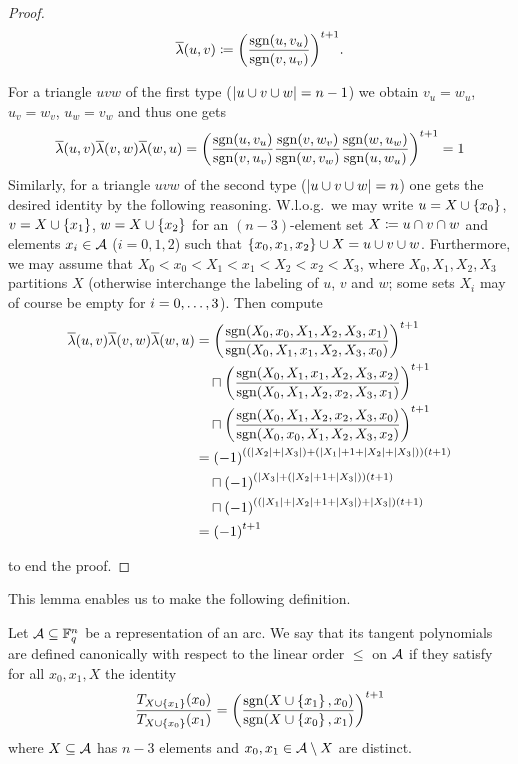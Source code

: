 \begin{proof}
    $$
    \overline{\lambda}(u,v)\mathrel{\mathrel{\mathop:}\mkern-1.2mu=} {\left(\frac{\mathop\mathrm{sgn}(u,v_u)}{\mathop\mathrm{sgn}(v,u_v)}\right)}^{t+1}\text{.}
    $$
    
    For a triangle $uvw$ of the first type ($\left\vert{u\cup v\cup w}\right\vert=n-1$) we obtain $v_u=w_u$, $u_v=w_v$, $u_w=v_w$ and thus one gets
    $$
    \overline{\lambda}(u,v)\overline{\lambda}(v,w)\overline{\lambda}(w,u) ={\left(\frac{\mathop\mathrm{sgn}(u,v_u)}{\mathop\mathrm{sgn}(v,u_v)}\frac{\mathop\mathrm{sgn}(v,w_v)}{\mathop\mathrm{sgn}(w,v_w)}\frac{\mathop\mathrm{sgn}(w,u_w)}{\mathop\mathrm{sgn}(u,w_u)}\right)}^{t+1}\\
    =1
    $$
    Similarly, for a triangle $uvw$ of the second type ($\left\vert{u\cup v\cup w}\right\vert=n$) one gets the desired identity by the following reasoning. W.l.o.g.\ we may write $u=X\setjoin\set{x_0}$, $v=X\setjoin\set{x_1}$, $w=X\setjoin\set{x_2}$ for an $(n-3)$-element set $X\mathrel{\mathrel{\mathop:}\mkern-1.2mu=} u\cap v\cap w$ and elements $x_i\in \mathcal{A}$ ($i=0,1,2$) such that $\set{x_0,x_1,x_2}\setjoin X=u\setjoin v\setjoin w$. Furthermore, we may assume that $X_0<x_0<X_1<x_1<X_2<x_2<X_3$, where $X_0,X_1,X_2,X_3$ partitions $X$ (otherwise interchange the labeling of $u$, $v$ and $w$; some sets $X_i$ may of course be empty for $i=\range 0 3$). Then compute
    \begin{align*}
        \bar{\lambda}(u,v)\bar{\lambda}(v,w)\bar{\lambda}(w,u) 
 & = {\left(\frac{\sgn(X_0,x_0,X_1,X_2,X_3,x_1)}{\sgn(X_0,X_1,x_1,X_2,X_3,x_0)}\right)}^{t+1}              \\
 & \quad\setprod {\left(\frac{\sgn(X_0,X_1,x_1,X_2,X_3,x_2)}{\sgn(X_0,X_1,X_2,x_2,X_3,x_1)}\right)}^{t+1} \\
 & \quad\setprod {\left(\frac{\sgn(X_0,X_1,X_2,x_2,X_3,x_0)}{\sgn(X_0,x_0,X_1,X_2,X_3,x_2)}\right)}^{t+1} \\
 & = {(-1)}^{((|X_2|+|X_3|)+(|X_1|+1+|X_2|+|X_3|))(t+1)}                                                 \\
 & \quad\setprod {(-1)}^{(|X_3|+(|X_2|+1+|X_3|))(t+1)}                                                   \\
 & \quad\setprod {(-1)}^{((|X_1|+|X_2|+1+|X_3|)+|X_3|)(t+1)}                                            \\
 & = {(-1)}^{t+1}
\end{align*}

  to end the proof.
\end{proof}

This lemma enables us to make the following definition.

\begin{definition}
    Let $\mathcal{A}\subseteq\mathbb{F}_{q}^n$ be a representation of an arc. We say that its tangent polynomials are defined canonically with respect to the linear order $\leq$ on $\mathcal{A}$ if they satisfy for all $x_0,x_1,X$ the identity
    $$
    \frac{T_{X\setjoin\set{x_1}}(x_0)}{T_{X\setjoin\set{x_0}}(x_1)} = {\left(\frac{\sgn(X\setjoin\set{x_1},x_0)}{\sgn(X\setjoin\set{x_0},x_1)}\right)}^{t+1}
    $$
    where $X\subseteq \mathcal{A}$ has $n-3$ elements and $x_0,x_1\in \mathcal{A}\setminus X$ are distinct.
\end{definition}

